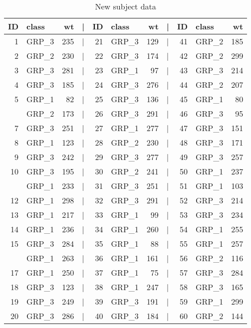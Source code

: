 \documentclass[smallextended]{svjour3}       %
\begin{document}
\begin{table}

\caption{\label{tab:new-data}New subject data}
\centering
\begin{tabular}[t]{rlrlrlrlrlr}
\toprule
ID & class & wt & | & ID & class & wt & | & ID & class & wt\\
\midrule
1 & GRP\_3 & 235 & | & 21 & GRP\_3 & 129 & | & 41 & GRP\_2 & 185\\
2 & GRP\_2 & 230 & | & 22 & GRP\_3 & 174 & | & 42 & GRP\_2 & 299\\
3 & GRP\_3 & 281 & | & 23 & GRP\_1 & 97 & | & 43 & GRP\_3 & 214\\
4 & GRP\_3 & 185 & | & 24 & GRP\_3 & 276 & | & 44 & GRP\_2 & 207\\
5 & GRP\_1 & 82 & | & 25 & GRP\_3 & 136 & | & 45 & GRP\_1 & 80\\
\addlinespace
6 & GRP\_2 & 173 & | & 26 & GRP\_3 & 291 & | & 46 & GRP\_3 & 95\\
7 & GRP\_3 & 251 & | & 27 & GRP\_1 & 277 & | & 47 & GRP\_3 & 151\\
8 & GRP\_1 & 123 & | & 28 & GRP\_2 & 230 & | & 48 & GRP\_3 & 171\\
9 & GRP\_3 & 242 & | & 29 & GRP\_3 & 277 & | & 49 & GRP\_3 & 257\\
10 & GRP\_3 & 195 & | & 30 & GRP\_2 & 241 & | & 50 & GRP\_1 & 237\\
\addlinespace
11 & GRP\_1 & 233 & | & 31 & GRP\_3 & 251 & | & 51 & GRP\_1 & 103\\
12 & GRP\_1 & 298 & | & 32 & GRP\_3 & 291 & | & 52 & GRP\_3 & 214\\
13 & GRP\_1 & 217 & | & 33 & GRP\_1 & 99 & | & 53 & GRP\_3 & 234\\
14 & GRP\_1 & 236 & | & 34 & GRP\_1 & 260 & | & 54 & GRP\_1 & 255\\
15 & GRP\_3 & 284 & | & 35 & GRP\_1 & 88 & | & 55 & GRP\_1 & 257\\
\addlinespace
16 & GRP\_1 & 263 & | & 36 & GRP\_1 & 161 & | & 56 & GRP\_2 & 116\\
17 & GRP\_1 & 250 & | & 37 & GRP\_1 & 75 & | & 57 & GRP\_3 & 284\\
18 & GRP\_3 & 123 & | & 38 & GRP\_1 & 247 & | & 58 & GRP\_3 & 165\\
19 & GRP\_3 & 249 & | & 39 & GRP\_3 & 191 & | & 59 & GRP\_1 & 299\\
20 & GRP\_3 & 286 & | & 40 & GRP\_3 & 184 & | & 60 & GRP\_2 & 144\\
\bottomrule
\end{tabular}
\end{table}
\end{document}
